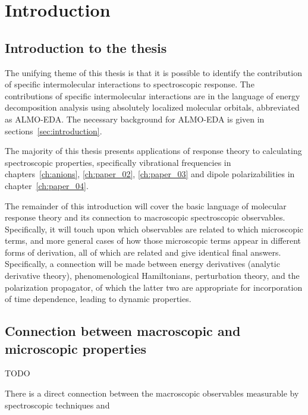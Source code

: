 \documentclass[%
class = book,%
crop = false,%
float = true,%
multi = true,%
preview = false,%
]{standalone}
\begin{document}
\chapter{Introduction}
\label{ch:introduction}

\section{Introduction to the thesis}

The unifying theme of this thesis is that it is possible to identify the contribution of specific intermolecular interactions to spectroscopic response. The contributions of specific intermolecular interactions are in the language of energy decomposition analysis using absolutely localized molecular orbitals, abbreviated as ALMO-EDA. The necessary background for ALMO-EDA is given in sections~\ref{sec:introduction}.

The majority of this thesis presents applications of response theory to calculating spectroscopic properties, specifically vibrational frequencies in chapters~\ref{ch:anions}, \ref{ch:paper_02}, \ref{ch:paper_03} and dipole polarizabilities in chapter~\ref{ch:paper_04}.

The remainder of this introduction will cover the basic language of molecular response theory and its connection to macroscopic spectroscopic observables. Specifically, it will touch upon which observables are related to which microscopic terms, and more general cases of how those microscopic terms appear in different forms of derivation, all of which are related and give identical final answers. Specifically, a connection will be made between energy derivatives (analytic derivative theory), phenomenological Hamiltonians, perturbation theory, and the polarization propagator, of which the latter two are appropriate for incorporation of time dependence, leading to dynamic properties.

\section{Connection between macroscopic and microscopic properties}

TODO

There is a direct connection between the macroscopic observables measurable by spectroscopic techniques and
\end{document}
